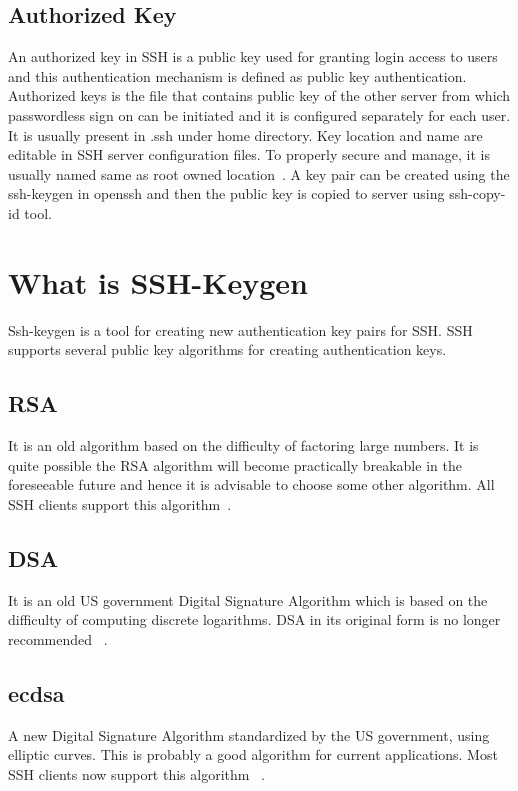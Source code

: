 \subsection{Authorized Key}
An authorized key in SSH is a public key used for granting login access
to users and this authentication mechanism is defined as public key 
authentication. Authorized keys is the file that contains public 
key of the other server from which passwordless sign on can be 
initiated and it is configured separately for each user. It is 
usually present in .ssh under home directory. 
Key location and name are editable in SSH server configuration 
files. To properly secure and manage, it is usually named same as 
root owned location~\cite{hid-sp18-513-sshkeyinc}.
A key pair can be created using the ssh-keygen in openssh and then
the public key is copied to server using ssh-copy-id tool.

\section{What is SSH-Keygen}
Ssh-keygen is a tool for creating new authentication key pairs 
for SSH. SSH supports several public key algorithms for creating
authentication keys. 

\subsection{RSA}
It is an old algorithm based on the difficulty of factoring large 
numbers. It is quite possible the RSA algorithm will become 
practically breakable in the foreseeable future and hence it is 
advisable to choose some other algorithm. All SSH clients support
this algorithm~\cite{hid-sp18-513-sshkeyinc}.

\subsection{DSA}
It is an old US government Digital Signature Algorithm which is
based on the difficulty of computing discrete logarithms. 
DSA in its original form is no longer recommended
~\cite{hid-sp18-513-sshkeyinc}.

\subsection{ecdsa}
A new Digital Signature Algorithm standardized by the US government,
using elliptic curves. This is probably a good algorithm for current
applications. Most SSH clients now support this algorithm
~\cite{hid-sp18-513-sshkeyinc}.

